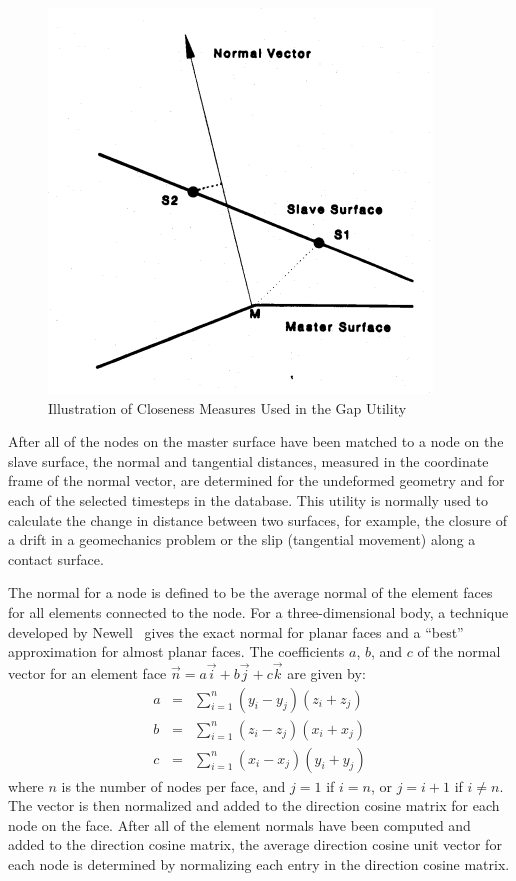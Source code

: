 \begin{figure}
\centering
\includegraphics[scale=0.65]{figures/Gap.png}
\caption{Illustration of Closeness Measures Used in the Gap Utility}
\label{f:gap}
\end{figure}

After all of the nodes on the master surface have been matched to a node
on the slave surface, the normal and tangential distances, measured in
the coordinate frame of the normal vector, are determined for the
undeformed geometry and for each of the selected timesteps in the
database.  This utility is normally used to calculate the change in
distance between two surfaces, for example, the closure of a drift in a
geomechanics problem or the slip (tangential movement) along a contact
surface.

The normal for a node is defined to be the average normal of the element
faces for all elements connected to the node.  For a three-dimensional
body, a technique developed by Newell~\cite{Rogers:pefcg} gives the
exact normal for planar faces and a ``best'' approximation for almost
planar faces. The coefficients $a$, $b$, and $c$ of the normal vector
for an element face $\vec{n} = a\vec{i} + b\vec{j} + c\vec{k}$ are given by:
\begin{eqnarray}
a &=& \sum_{i=1}^n (y_i - y_j)(z_i + z_j) \nonumber\\
b &=& \sum_{i=1}^n (z_i - z_j)(x_i + x_j) \label{3dnorm}\\
c &=& \sum_{i=1}^n (x_i - x_j)(y_i + y_j) \nonumber
\end{eqnarray}
where $n$ is the number of nodes per face, and $j = 1$ if $i=n$, or
$j=i+1$ if $i\ne n$.  The vector is then normalized and added to the
direction cosine matrix for each node on the face.  After all of the
element normals have been computed and added to the direction cosine
matrix, the average direction cosine unit vector for each node is
determined by normalizing each entry in the direction cosine matrix.

